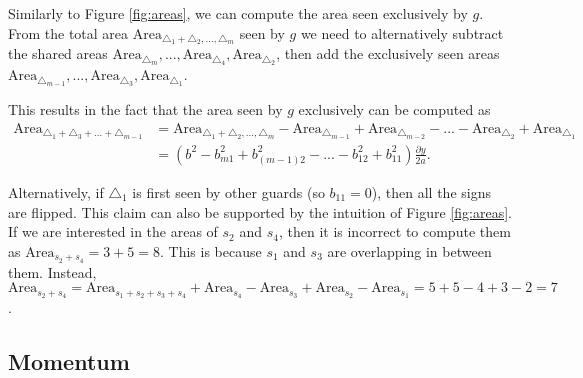 Similarly to Figure \ref{fig:areas}, we can compute the area seen exclusively by $g$. From the total area $\text{Area}_{\triangle_1 + \triangle_2, ..., \triangle_m}$ seen by $g$ we need to alternatively subtract the shared areas $\text{Area}_{\triangle_m}, ..., \text{Area}_{\triangle_4}, \text{Area}_{\triangle_2}$, then add the exclusively seen areas $\text{Area}_{\triangle_{m - 1}}, ..., \text{Area}_{\triangle_3}, \text{Area}_{\triangle_1}$.


This results in the fact that the area seen by $g$ exclusively can be computed as 
\begin{align*}
    \text{Area}_{\triangle_1 + \triangle_3 + ... + \triangle_{m - 1}} &= \text{Area}_{\triangle_1 + \triangle_2, ..., \triangle_m} - \text{Area}_{\triangle_{m - 1}} + \text{Area}_{\triangle_{m - 2}} - ... - \text{Area}_{\triangle_2} + \text{Area}_{\triangle_1} \\
                                                                      &= \left(b^2 - b_{m1}^2 + b_{(m - 1)2}^2 - ... - b_{12}^2 + b_{11}^2\right)\frac{\partial y}{2a}.
\end{align*}

Alternatively, if $\triangle_1$ is first seen by other guards (so $b_{11} = 0$), then all the signs are flipped. This claim can also be supported by the intuition of Figure \ref{fig:areas}. If we are interested in the areas of $s_2$ and $s_4$, then it is incorrect to compute them as $\text{Area}_{s_2 + s_4} = 3 + 5 = 8$. This is because $s_1$ and $s_3$ are overlapping in between them.  Instead, $\text{Area}_{s_2 + s_4} = \text{Area}_{s_1 + s_2 + s_3 + s_4} + \text{Area}_{s_4} - \text{Area}_{s_3} + \text{Area}_{s_2} - \text{Area}_{s_1} = 5 + 5 - 4 + 3 - 2 = 7$.

\subsection{Momentum}

